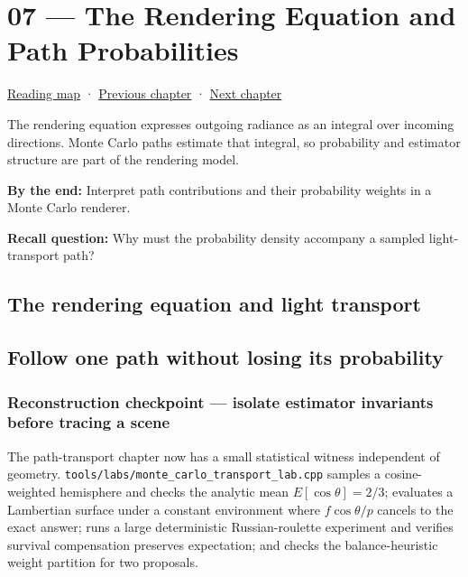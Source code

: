 \hypertarget{03-visual-computing-i-ch007}{}
\chapter{07 --- The Rendering Equation and Path Probabilities}\label{03-visual-computing-i-ch007-the-rendering-equation-and-path-probabilities}

\hyperref[volume-reading-map]{Reading map} · \hyperref[03-visual-computing-i-ch006-from-material-data-to-gpu-bindings]{Previous chapter} · \hyperref[03-visual-computing-i-ch008-sampling-directions-and-light-transport]{Next chapter}

The rendering equation expresses outgoing radiance as an integral over incoming directions. Monte Carlo paths estimate that integral, so probability and estimator structure are part of the rendering model.

\textbf{By the end:} Interpret path contributions and their probability weights in a Monte Carlo renderer.

\textbf{Recall question:} Why must the probability density accompany a sampled light-transport path?

\section{The rendering equation and light transport}\label{03-visual-computing-i-ch007-the-rendering-equation-and-light-transport}

\section{Follow one path without losing its probability}\label{03-visual-computing-i-ch007-follow-one-path-without-losing-its-probability}

\subsection{Reconstruction checkpoint --- isolate estimator invariants before tracing a scene}\label{03-visual-computing-i-ch007-reconstruction-checkpoint-isolate-estimator-invariants-before-tracing-a-scene}

The path-transport chapter now has a small statistical witness independent of geometry. \texttt{tools/labs/monte\_carlo\_transport\_lab.cpp} samples a cosine-weighted hemisphere and checks the analytic mean \(E[\cos\theta]=2/3\); evaluates a Lambertian surface under a constant environment where \(f\cos\theta/p\) cancels to the exact answer; runs a large deterministic Russian-roulette experiment and verifies survival compensation preserves expectation; and checks the balance-heuristic weight partition for two proposals.

